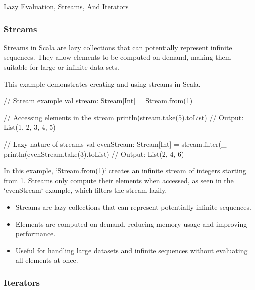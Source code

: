 \begin{notes}{Lazy Evaluation, Streams, And Iterators}
\begin{highlight}
    \end{highlight}
    
    \subsubsection*{Streams}
    
    Streams in Scala are lazy collections that can potentially represent infinite sequences. They allow elements to be computed on demand, making them suitable for large or infinite data sets.
    
    \begin{highlight}[Streams]
    
        This example demonstrates creating and using streams in Scala.
    
    \begin{code}[Scala]
    // Stream example
    val stream: Stream[Int] = Stream.from(1)
    
    // Accessing elements in the stream
    println(stream.take(5).toList)  // Output: List(1, 2, 3, 4, 5)
    
    // Lazy nature of streams
    val evenStream: Stream[Int] = stream.filter(_ %
    println(evenStream.take(3).toList)  // Output: List(2, 4, 6)
    \end{code}
    
        In this example, `Stream.from(1)` creates an infinite stream of integers starting from 1. Streams only compute their elements when accessed, as seen in the `evenStream` example, which filters the stream lazily.
    
        \begin{itemize}
            \item Streams are lazy collections that can represent potentially infinite sequences.
            \item Elements are computed on demand, reducing memory usage and improving performance.
            \item Useful for handling large datasets and infinite sequences without evaluating all elements at once.
        \end{itemize}
    
    \end{highlight}
    
    \subsubsection*{Iterators}
    

\end{notes}
